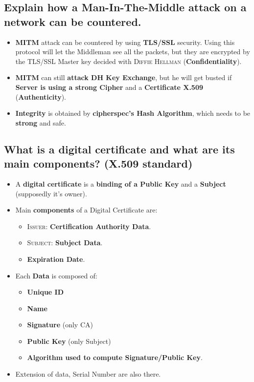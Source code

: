 \documentclass[9pt, letterpaper]{article}
\begin{document}
\subsection{Explain how a Man-In-The-Middle attack on a network can be countered.}
\begin{itemize}
	\item \textbf{MITM} attack can be countered by using \textbf{TLS/SSL} security. Using this protocol will let the Middleman see all the packets, but they are encrypted by the TLS/SSL Master key decided with \textsc{Diffie Hellman} (\textbf{Confidentiality}).
	\item \textbf{MITM} can still \textbf{attack DH Key Exchange}, but he will get busted if \textbf{Server is using a strong Cipher} and a \textbf{Certificate X.509} (\textbf{Authenticity}).
	\item \textbf{Integrity} is obtained by \textbf{cipherspec's Hash Algorithm}, which needs to be \textbf{strong} and safe.
\end{itemize}

\subsection{What is a digital certificate and what are its main components? (X.509 standard)}
\begin{itemize}
	\item A \textbf{digital certificate} is a \textbf{binding of a Public Key} and a \textbf{Subject} (supposedly it's owner).
	\item Main \textbf{components} of a Digital Certificate are:
	\begin{itemize}
		\item \textsc{Issuer}: \textbf{Certification Authority Data}.
		\item \textsc{Subject}: \textbf{Subject Data}.
		\item \textbf{Expiration Date}.
	\end{itemize}
	\item Each \textbf{Data} is composed of:
	\begin{itemize}
		\item \textbf{Unique ID}
		\item \textbf{Name}
		\item \textbf{Signature} (only CA)
		\item \textbf{Public Key} (only Subject)
		\item \textbf{Algorithm used to compute Signature/Public Key}.
	\end{itemize}
	\item Extension of data, Serial Number are also there.
\end{itemize}
\end{document}
